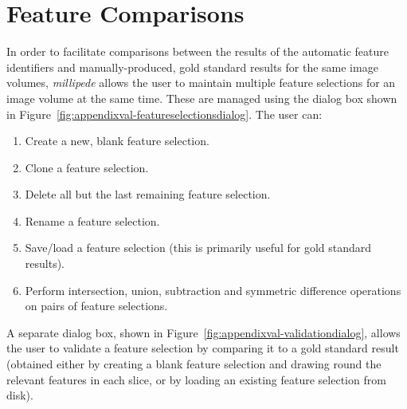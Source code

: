 
\newpage

\section{Feature Comparisons}
\label{sec:appendixval-featurecomparisons}


In order to facilitate comparisons between the results of the automatic feature identifiers and manually-produced, gold standard results for the same image volumes, \emph{millipede} allows the user to maintain multiple feature selections for an image volume at the same time. These are managed using the dialog box shown in Figure~\ref{fig:appendixval-featureselectionsdialog}. The user can:


\begin{enumerate}
\item Create a new, blank feature selection.
\item Clone a feature selection.
\item Delete all but the last remaining feature selection.
\item Rename a feature selection.
\item Save/load a feature selection (this is primarily useful for gold standard results).
\item Perform intersection, union, subtraction and symmetric difference operations on pairs of feature selections.
\end{enumerate}

\noindent A separate dialog box, shown in Figure~\ref{fig:appendixval-validationdialog}, allows the user to validate a feature selection by comparing it to a gold standard result (obtained either by creating a blank feature selection and drawing round the relevant features in each slice, or by loading an existing feature selection from disk).


